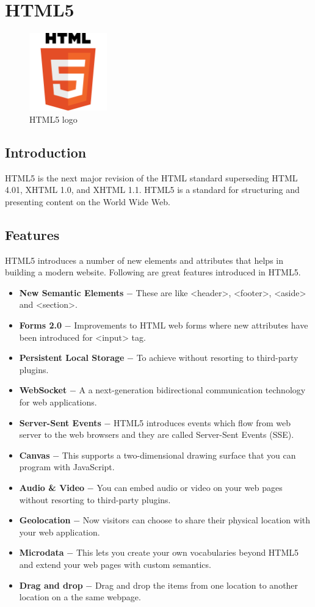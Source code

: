 \documentclass[12pt]{article}
\begin{document}
\section{HTML5}
\begin{figure}[h]
	\centering
	\includegraphics[width=0.3\textwidth]{HTML5_logo.png}
	\caption{HTML5 logo}
\end{figure}
\subsection{Introduction}
HTML5 is the next major revision of the HTML standard superseding HTML 4.01, XHTML 1.0, and XHTML 1.1. HTML5 is a standard for structuring and presenting content on the World Wide Web.
\subsection{Features}
HTML5 introduces a number of new elements and attributes that helps in building a modern website. Following are great features introduced in HTML5.
\begin{itemize}
	\item \textbf{New Semantic Elements} − These are like <header>, <footer>, <aside> and <section>.
	\item \textbf{Forms 2.0} − Improvements to HTML web forms where new attributes have been introduced for <input> tag.
	\item \textbf{Persistent Local Storage} − To achieve without resorting to third-party plugins.
	\item \textbf{WebSocket} − A a next-generation bidirectional communication technology for web applications.
	\item \textbf{Server-Sent Events} − HTML5 introduces events which flow from web server to the web browsers and they are called Server-Sent Events (SSE).
	\item \textbf{Canvas} − This supports a two-dimensional drawing surface that you can program with JavaScript.
	\item \textbf{Audio \& Video} − You can embed audio or video on your web pages without resorting to third-party plugins.
	\item \textbf{Geolocation} − Now visitors can choose to share their physical location with your web application.
	\item \textbf{Microdata} − This lets you create your own vocabularies beyond HTML5 and extend your web pages with custom semantics.
	\item \textbf{Drag and drop} − Drag and drop the items from one location to another location on a the same webpage.
\end{itemize}	
\end{document}
